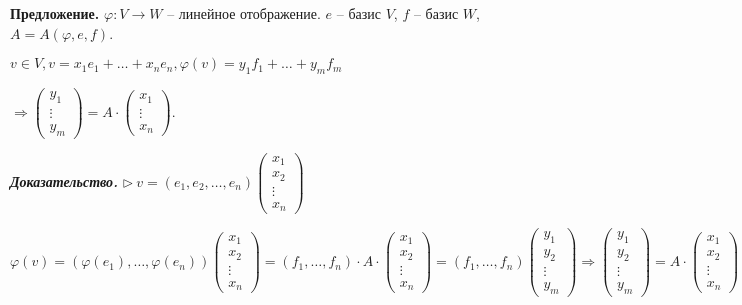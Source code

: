 \vspace{\baselineskip}
\textbf{Предложение.} $\varphi : V \rightarrow W$ -- линейное отображение. $e$ -- базис $V$, $f$ -- базис $W$, $A = A(\varphi, e, f)$.

$v \in V, v = x_1 e_1 + \dots + x_n e_n, \varphi(v) = y_1 f_1 + \dots + y_m f_m$

$\Rightarrow \begin{pmatrix} y_1 \\ \vdots \\ y_m \end{pmatrix} = A \cdot \begin{pmatrix} x_1 \\ \vdots \\ x_n \end{pmatrix}$.

\vspace{\baselineskip}
\textbf{\textit{Доказательство.}} $\rhd \ v = (e_1, e_2, \dots, e_n) \begin{pmatrix} x_1 \\ x_2 \\ \vdots \\ x_n \end{pmatrix}$

$\varphi(v) = (\varphi(e_1), \dots, \varphi(e_n)) \begin{pmatrix} x_1 \\ x_2 \\ \vdots \\ x_n \end{pmatrix} = (f_1, \dots, f_n) \cdot A \cdot \begin{pmatrix} x_1 \\ x_2 \\ \vdots \\ x_n \end{pmatrix} = (f_1, \dots, f_n) \begin{pmatrix} y_1 \\ y_2 \\ \vdots \\ y_m \end{pmatrix} \Rightarrow \begin{pmatrix} y_1 \\ y_2 \\ \vdots \\ y_m \end{pmatrix} = A \cdot \begin{pmatrix} x_1 \\ x_2 \\ \vdots \\ x_n \end{pmatrix} \ \lhd$

